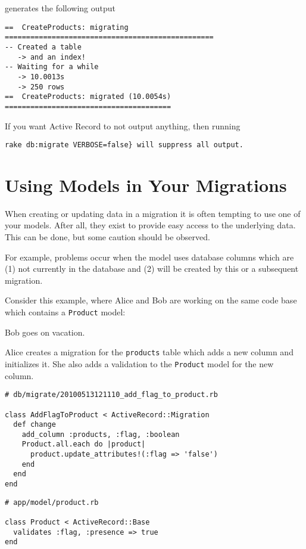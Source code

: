 \documentclass[10pt]{book}
\begin{document}
generates the following output
\begin{verbatim}
==  CreateProducts: migrating =================================================
-- Created a table
   -> and an index!
-- Waiting for a while
   -> 10.0013s
   -> 250 rows
==  CreateProducts: migrated (10.0054s) =======================================
\end{verbatim}

If you want Active Record to not output anything, then running
\begin{verbatim}
rake db:migrate VERBOSE=false} will suppress all output.  
\end{verbatim}


\section{ Using Models in Your Migrations}

When creating or updating data in a migration it is often tempting to use one of your models. After all, they exist to provide easy access to the underlying data. This can be done, but some caution should be observed.

For example, problems occur when the model uses database columns which are (1) not currently in the database and (2) will be created by this or a subsequent migration.

Consider this example, where Alice and Bob are working on the same code base which contains a \texttt{Product} model:

Bob goes on vacation.

Alice creates a migration for the \texttt{products} table which adds a new column and initializes it.  She also adds a validation to the \texttt{Product} model for the new column.
\begin{verbatim}
# db/migrate/20100513121110_add_flag_to_product.rb
 
class AddFlagToProduct < ActiveRecord::Migration
  def change
    add_column :products, :flag, :boolean
    Product.all.each do |product|
      product.update_attributes!(:flag => 'false')
    end
  end
end
\end{verbatim}

\begin{verbatim}
# app/model/product.rb
 
class Product < ActiveRecord::Base
  validates :flag, :presence => true
end
\end{verbatim}
\end{document}
